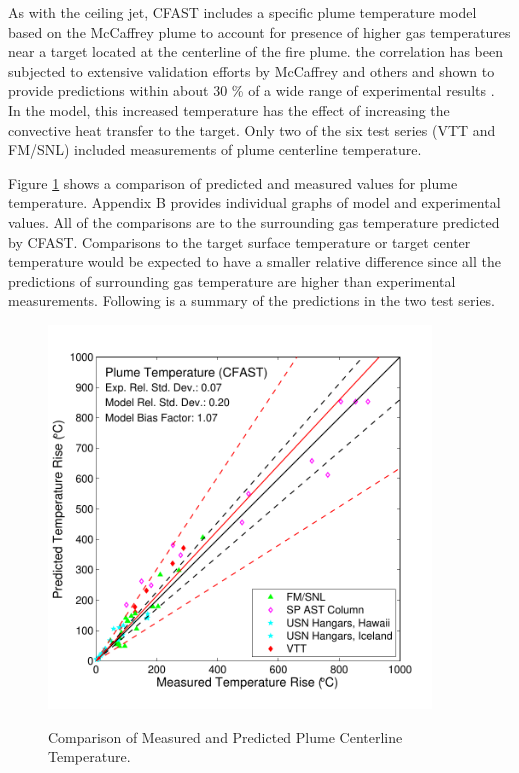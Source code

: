 As with the ceiling jet, CFAST includes a specific plume temperature model based on the McCaffrey plume \cite{Baum:1989, McCaffrey:1983} to account for presence of higher gas temperatures near a target located at the centerline of the fire plume. the correlation has been subjected to extensive validation efforts by McCaffrey \cite{Baum:1989} and others \cite{Valid:Davis_Plumes} and shown to provide predictions within about 30 \% of a wide range of experimental results \cite{Valid:Davis_Plumes}. In the model, this increased temperature has the effect of increasing the convective heat transfer to the target. Only two of the six test series (VTT and FM/SNL) included measurements of plume centerline temperature.

Figure \ref{fig:Plume_Temp_Scatter} shows a comparison of predicted and measured values for plume temperature. Appendix B provides individual graphs of model and experimental values. All of the comparisons are to the surrounding gas temperature predicted by CFAST. Comparisons to the target surface temperature or target center temperature would be expected to have a smaller relative difference since all the predictions of surrounding gas temperature are higher than experimental measurements. Following is a summary of the predictions in the two test series.

\begin{figure}
\begin{center}
\includegraphics[width=4.0in]{FIGURES/ScatterPlots/Plume_Temperature}  \\
\end{center}
\caption{Comparison of Measured and Predicted Plume Centerline Temperature.} \label{fig:Plume_Temp_Scatter}
\end{figure}


